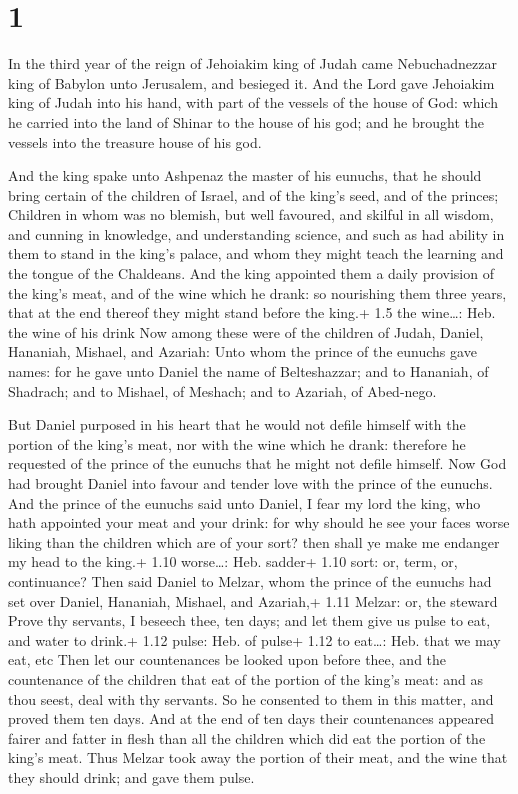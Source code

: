 \hypertarget{section}{%
\section{1}\label{section}}

 In the third year of the reign of Jehoiakim king of Judah
came Nebuchadnezzar king of Babylon unto Jerusalem, and besieged it.
 And the Lord gave Jehoiakim king of Judah into his hand,
with part of the vessels of the house of God: which he carried into the
land of Shinar to the house of his god; and he brought the vessels into
the treasure house of his god.

 And the king spake unto Ashpenaz the master of his
eunuchs, that he should bring certain of the children of Israel, and of
the king's seed, and of the princes;  Children in whom was
no blemish, but well favoured, and skilful in all wisdom, and cunning in
knowledge, and understanding science, and such as had ability in them to
stand in the king's palace, and whom they might teach the learning and
the tongue of the Chaldeans.  And the king appointed them a
daily provision of the king's meat, and of the wine which he drank: so
nourishing them three years, that at the end thereof they might stand
before the king.+ 1.5 the wine\ldots: Heb. the wine of his drink
 Now among these were of the children of Judah, Daniel,
Hananiah, Mishael, and Azariah:  Unto whom the prince of the
eunuchs gave names: for he gave unto Daniel the name of Belteshazzar;
and to Hananiah, of Shadrach; and to Mishael, of Meshach; and to
Azariah, of Abed-nego.

 But Daniel purposed in his heart that he would not defile
himself with the portion of the king's meat, nor with the wine which he
drank: therefore he requested of the prince of the eunuchs that he might
not defile himself.  Now God had brought Daniel into favour
and tender love with the prince of the eunuchs.  And the
prince of the eunuchs said unto Daniel, I fear my lord the king, who
hath appointed your meat and your drink: for why should he see your
faces worse liking than the children which are of your sort? then shall
ye make me endanger my head to the king.+ 1.10 worse\ldots: Heb. sadder+
1.10 sort: or, term, or, continuance?  Then said Daniel to
Melzar, whom the prince of the eunuchs had set over Daniel, Hananiah,
Mishael, and Azariah,+ 1.11 Melzar: or, the steward  Prove
thy servants, I beseech thee, ten days; and let them give us pulse to
eat, and water to drink.+ 1.12 pulse: Heb. of pulse+ 1.12 to eat\ldots:
Heb. that we may eat, etc  Then let our countenances be
looked upon before thee, and the countenance of the children that eat of
the portion of the king's meat: and as thou seest, deal with thy
servants.  So he consented to them in this matter, and
proved them ten days.  And at the end of ten days their
countenances appeared fairer and fatter in flesh than all the children
which did eat the portion of the king's meat.  Thus Melzar
took away the portion of their meat, and the wine that they should
drink; and gave them pulse.

